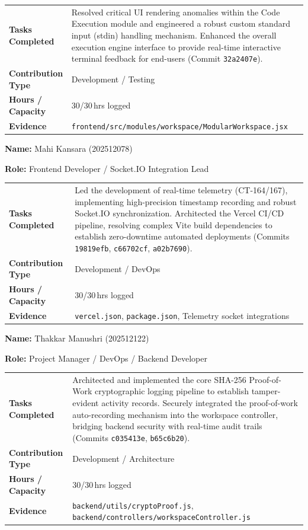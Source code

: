\documentclass[11pt,a4paper]{article}
\newcommand{\field}[2]{\textbf{#1:} #2\par}
\begin{document}
\vspace{4pt}
{\small
\begin{tabular}{>{\bfseries}p{} p{}}
\toprule
Tasks Completed & Resolved critical UI rendering anomalies within the Code Execution module and engineered a robust custom standard input (stdin) handling mechanism. Enhanced the overall execution engine interface to provide real-time interactive terminal feedback for end-users (Commit \texttt{32a2407e}). \\
Contribution Type & Development / Testing \\
Hours / Capacity & 30/30\,hrs logged \\
Evidence & \texttt{frontend/src/modules/workspace/ModularWorkspace.jsx} \\
\bottomrule
\end{tabular}
}

\vspace{6pt}

\field{Name}{Mahi Kansara (202512078)}
\field{Role}{Frontend Developer / Socket.IO Integration Lead}

\vspace{4pt}
{\small
\begin{tabular}{>{\bfseries}p{} p{}}
\toprule
Tasks Completed & Led the development of real-time telemetry (CT-164/167), implementing high-precision timestamp recording and robust Socket.IO synchronization. Architected the Vercel CI/CD pipeline, resolving complex Vite build dependencies to establish zero-downtime automated deployments (Commits \texttt{19819efb}, \texttt{c66702cf}, \texttt{a02b7690}). \\
Contribution Type & Development / DevOps \\
Hours / Capacity & 30/30\,hrs logged \\
Evidence & \texttt{vercel.json}, \texttt{package.json}, Telemetry socket integrations \\
\bottomrule
\end{tabular}
}

\vspace{6pt}

\field{Name}{Thakkar Manushri (202512122)}
\field{Role}{Project Manager / DevOps / Backend Developer}

\vspace{4pt}
{\small
\begin{tabular}{>{\bfseries}p{} p{}}
\toprule
Tasks Completed & Architected and implemented the core SHA-256 Proof-of-Work cryptographic logging pipeline to establish tamper-evident activity records. Securely integrated the proof-of-work auto-recording mechanism into the workspace controller, bridging backend security with real-time audit trails (Commits \texttt{c035413e}, \texttt{b65c6b20}). \\
Contribution Type & Development / Architecture \\
Hours / Capacity & 30/30\,hrs logged \\
Evidence & \texttt{backend/utils/cryptoProof.js}, \texttt{backend/controllers/workspaceController.js} \\
\bottomrule
\end{tabular}
}
\end{document}
